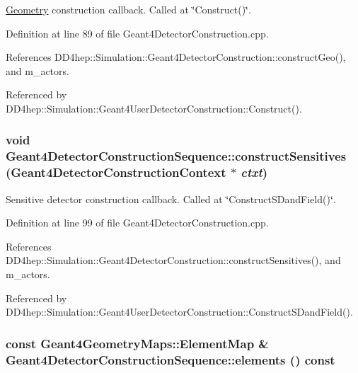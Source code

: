 \hyperlink{namespace_d_d4hep_1_1_geometry}{Geometry} construction callback. Called at \char`\"{}Construct()\char`\"{}. 

Definition at line 89 of file Geant4DetectorConstruction.cpp.

References DD4hep::Simulation::Geant4DetectorConstruction::constructGeo(), and m\_\-actors.

Referenced by DD4hep::Simulation::Geant4UserDetectorConstruction::Construct().\hypertarget{class_d_d4hep_1_1_simulation_1_1_geant4_detector_construction_sequence_ab242c91f95283ed32133f48f2bc573fa}{
\subsubsection[{constructSensitives}]{\setlength{\rightskip}{0pt plus 5cm}void Geant4DetectorConstructionSequence::constructSensitives ({\bf Geant4DetectorConstructionContext} $\ast$ {\em ctxt})}}
\label{class_d_d4hep_1_1_simulation_1_1_geant4_detector_construction_sequence_ab242c91f95283ed32133f48f2bc573fa}


Sensitive detector construction callback. Called at \char`\"{}ConstructSDandField()\char`\"{}. 

Definition at line 99 of file Geant4DetectorConstruction.cpp.

References DD4hep::Simulation::Geant4DetectorConstruction::constructSensitives(), and m\_\-actors.

Referenced by DD4hep::Simulation::Geant4UserDetectorConstruction::ConstructSDandField().\hypertarget{class_d_d4hep_1_1_simulation_1_1_geant4_detector_construction_sequence_a1b65d4014a1354c2b56158173cd2a108}{
\subsubsection[{elements}]{\setlength{\rightskip}{0pt plus 5cm}const {\bf Geant4GeometryMaps::ElementMap} \& Geant4DetectorConstructionSequence::elements () const}}
\label{class_d_d4hep_1_1_simulation_1_1_geant4_detector_construction_sequence_a1b65d4014a1354c2b56158173cd2a108}


